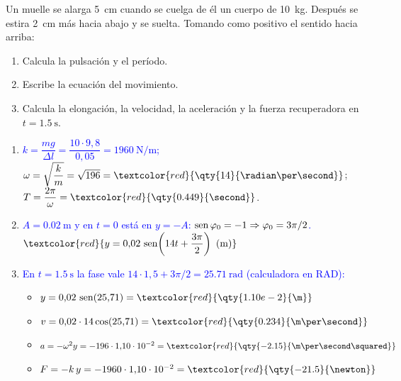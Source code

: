 \begin{exercise}
    Un muelle se alarga \qty{5}{\cm} cuando se cuelga de él un cuerpo de \qty{10}{\kg}. Después se estira \qty{2}{\cm} más
    hacia abajo y se suelta. Tomando como positivo el sentido hacia arriba:
    \begin{enumerate}[label=\letraminuscula]
        \item Calcula la pulsación y el período.
        \item Escribe la ecuación del movimiento.
        \item Calcula la elongación, la velocidad, la aceleración y la fuerza recuperadora en \(t = \qty{1.5}{\second}\).
    \end{enumerate}
    \begin{solu}
        \begin{enumerate}[label=\letraminuscula]
            \item \textcolor{blue}{\(k = \dfrac{mg}{\Delta l} = \dfrac{10\cdot 9{,}8}{0{,}05} = \qty{1960}{\newton\per\m}\);}
            \(\omega = \sqrt{\dfrac{k}{m}} = \sqrt{196} = \textcolor{red}{\qty{14}{\radian\per\second}}\);
            \(T = \dfrac{2\pi}{\omega} = \textcolor{red}{\qty{0.449}{\second}}\).
            \item \textcolor{blue}{\(A = \qty{0.02}{\m}\) y en \(t = 0\) está en \(y = -A\): \(\operatorname{sen}\varphi_0 = -1 \Rightarrow \varphi_0 = 3\pi/2\).}
            \(\textcolor{red}{y = 0{,}02\,\sen\!\left(14 t + \dfrac{3\pi}{2}\right)\ \text{(m)}}\)
            \item \textcolor{blue}{En \(t = \qty{1.5}{\second}\) la fase vale \(14\cdot 1{,}5 + 3\pi/2 = \qty{25.71}{\radian}\) (calculadora en RAD):}
            \begin{itemize}
                \item \(y = 0{,}02\,\sen(25{,}71) = \textcolor{red}{\qty{1.10e-2}{\m}}\)
                \item \(v = 0{,}02\cdot 14\cos(25{,}71) = \textcolor{red}{\qty{0.234}{\m\per\second}}\)
                \item \(a = -\omega^2 y = -196\cdot 1{,}10\cdot 10^{-2} = \textcolor{red}{\qty{-2.15}{\m\per\second\squared}}\)
                \item \(F = -k\,y = -1960\cdot 1{,}10\cdot 10^{-2} = \textcolor{red}{\qty{-21.5}{\newton}}\)
            \end{itemize}
        \end{enumerate}
    \end{solu}
\end{exercise}

